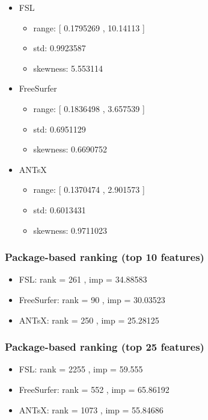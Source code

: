 \documentclass[
  10pt,
]{article}
\begin{document}
\begin{itemize}
\item
  FSL

  \begin{itemize}
  \item
    range: {[} 0.1795269 , 10.14113 {]}
  \item
    std: 0.9923587
  \item
    skewness: 5.553114
  \end{itemize}
\item
  FreeSurfer

  \begin{itemize}
  \item
    range: {[} 0.1836498 , 3.657539 {]}
  \item
    std: 0.6951129
  \item
    skewness: 0.6690752
  \end{itemize}
\item
  ANTsX

  \begin{itemize}
  \item
    range: {[} 0.1370474 , 2.901573 {]}
  \item
    std: 0.6013431
  \item
    skewness: 0.9711023
  \end{itemize}
\end{itemize}

\hypertarget{package-based-ranking-top-10-features-8}{%
\subsubsection{Package-based ranking (top 10
features)}\label{package-based-ranking-top-10-features-8}}

\begin{itemize}
\item
  FSL: rank = 261 , imp = 34.88583
\item
  FreeSurfer: rank = 90 , imp = 30.03523
\item
  ANTsX: rank = 250 , imp = 25.28125
\end{itemize}

\hypertarget{package-based-ranking-top-25-features-8}{%
\subsubsection{Package-based ranking (top 25
features)}\label{package-based-ranking-top-25-features-8}}

\begin{itemize}
\item
  FSL: rank = 2255 , imp = 59.555
\item
  FreeSurfer: rank = 552 , imp = 65.86192
\item
  ANTsX: rank = 1073 , imp = 55.84686
\end{itemize}
\end{document}
